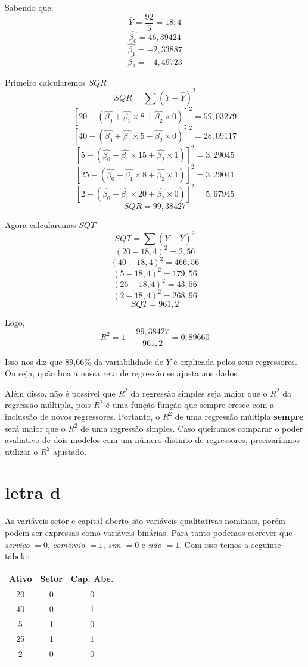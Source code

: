 Sabendo que:
\[\bar{Y} = \frac{92}{5} = 18,4 \]
\[\hat{\beta_{0}} = 46,39424 \]
\[\hat{\beta_{1}} = -2,33887 \]
\[\hat{\beta_{2}} = -4,49723 \]

Primeiro calcularemos \(SQR\)
\[SQR = \sum (Y - \widehat{Y})^{2}\]
\[ [ 20 - (\hat{\beta_{0}} + \hat{\beta_{1}} \times 8  + \hat{\beta_{2}} \times 0)]^{2} =  59,03279 \]
\[ [ 40 - (\hat{\beta_{0}} + \hat{\beta_{1}} \times 5  + \hat{\beta_{2}} \times 0)]^{2} =  28,09117 \]
\[ [ 5  - (\hat{\beta_{0}} + \hat{\beta_{1}} \times 15 + \hat{\beta_{2}} \times 1)]^{2} =  3,29045 \]
\[ [ 25 - (\hat{\beta_{0}} + \hat{\beta_{1}} \times 8  + \hat{\beta_{2}} \times 1)]^{2} =  3,29041 \]
\[ [ 2  - (\hat{\beta_{0}} + \hat{\beta_{1}} \times 20 + \hat{\beta_{2}} \times 0)]^{2} =  5,67945 \]
\[ SQR = 99,38427\]

Agora calcularemos \(SQT\)
\[SQT = \sum (Y-\bar{Y})^{2}\]
\[ ( 20 - 18,4)^{2} = 2,56 \]
\[ ( 40 - 18,4)^{2} = 466,56 \]
\[ ( 5 - 18,4)^{2} = 179,56 \]
\[ ( 25 - 18,4)^{2} = 43,56 \]
\[ ( 2 - 18,4)^{2} = 268,96 \]
\[ SQT = 961,2\]

Logo,
\[ R^{2} = 1 - \frac{99,38427}{961,2} = 0,89660\]

Isso nos diz que 89,66\% da variabilidade de \(Y\) é explicada pelos seus regressores. Ou seja, quão boa a nossa reta de regressão se ajusta aos dados.

Além disso, não é possível que \(R^{2}\) da regressão simples seja maior que o \(R^{2}\) da regressão múltipla, pois \(R^{2}\) é uma função função que sempre cresce com a inclussão de novos regressores. Portanto, o \(R^{2}\) de uma regressão múltipla \textbf{sempre} será maior que o \(R^{2}\) de uma regressão simples. Caso queiramos comparar o poder avaliativo de dois modelos com um número distinto de regressores, precisaríamos utilizar o \(R^{2}\) ajustado.

\section*{letra d}
As variáveis setor e capital aberto são variáveis qualitativas nominais, porém podem ser expressas como variáveis binárias. Para tanto podemos escrever que \textit{serviço} \(= 0\), \textit{comércio} \(= 1\), \textit{sim} \(= 0\) e \textit{não} \(= 1\). Com isso temos a seguinte tabela:
\begin{center}
	\begin{tabular}{|c|c|c|}
		\hline
		Ativo & Setor & Cap. Abe. \\ \hline
		20    & 0     & 0         \\ \hline
		40    & 0     & 1         \\ \hline
		5     & 1     & 0         \\ \hline
		25    & 1     & 1         \\ \hline
		2     & 0     & 0         \\ \hline
	\end{tabular}
\end{center}

